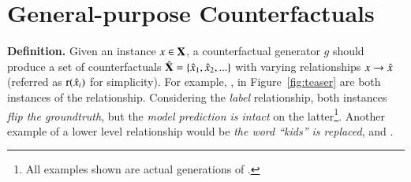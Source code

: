 \section{General-purpose Counterfactuals}
\label{sec:general_purpose}

\textbf{Definition.}
Given an instance $x \in \mathbf{X}$, a counterfactual generator $g$ should produce a set of counterfactuals $\hat{\mathbf{X}} = \{\hat{x}_1, \hat{x}_2, ...\}$ with varying relationships $x \rightarrow \hat{x}$ (referred as $\operatorname*{r}(\hat{x}_i)$ for simplicity).
For example, ,  in Figure~\ref{fig:teaser} are both instances of the  relationship.
Considering the \emph{label} relationship, both instances \emph{flip the groundtruth}, but the \emph{model prediction is intact} on the latter\footnote{All examples shown are actual generations of \sysname.}.
Another example of a lower level relationship would be \emph{the word ``kids'' is replaced}, \eg {} and .

